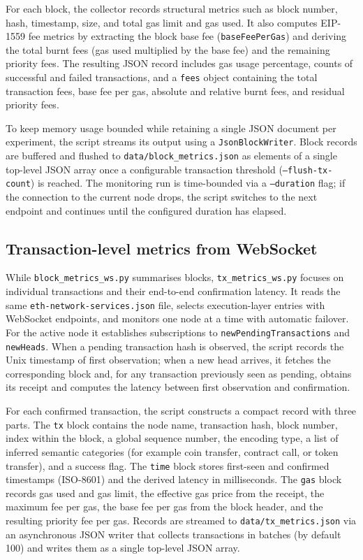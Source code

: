 For each block, the collector records structural metrics such as block number, hash, timestamp, size, and total gas limit and gas used. It also computes EIP-1559 fee metrics by extracting the block base fee (\texttt{baseFeePerGas}) and deriving the total burnt fees (gas used multiplied by the base fee) and the remaining priority fees. The resulting JSON record includes gas usage percentage, counts of successful and failed transactions, and a \texttt{fees} object containing the total transaction fees, base fee per gas, absolute and relative burnt fees, and residual priority fees.

To keep memory usage bounded while retaining a single JSON document per experiment, the script streams its output using a \texttt{JsonBlockWriter}. Block records are buffered and flushed to \texttt{data/block\_metrics.json} as elements of a single top-level JSON array once a configurable transaction threshold (\texttt{--flush-tx-count}) is reached. The monitoring run is time-bounded via a \texttt{--duration} flag; if the connection to the current node drops, the script switches to the next endpoint and continues until the configured duration has elapsed.

\subsection{Transaction-level metrics from WebSocket}

While \texttt{block\_metrics\_ws.py} summarises blocks, \texttt{tx\_metrics\_ws.py} focuses on individual transactions and their end-to-end confirmation latency. It reads the same \texttt{eth-network-services.json} file, selects execution-layer entries with WebSocket endpoints, and monitors one node at a time with automatic failover. For the active node it establishes subscriptions to \texttt{newPendingTransactions} and \texttt{newHeads}. When a pending transaction hash is observed, the script records the Unix timestamp of first observation; when a new head arrives, it fetches the corresponding block and, for any transaction previously seen as pending, obtains its receipt and computes the latency between first observation and confirmation.

For each confirmed transaction, the script constructs a compact record with three parts. The \texttt{tx} block contains the node name, transaction hash, block number, index within the block, a global sequence number, the encoding type, a list of inferred semantic categories (for example coin transfer, contract call, or token transfer), and a success flag. The \texttt{time} block stores first-seen and confirmed timestamps (ISO-8601) and the derived latency in milliseconds. The \texttt{gas} block records gas used and gas limit, the effective gas price from the receipt, the maximum fee per gas, the base fee per gas from the block header, and the resulting priority fee per gas. Records are streamed to \texttt{data/tx\_metrics.json} via an asynchronous JSON writer that collects transactions in batches (by default 100) and writes them as a single top-level JSON array.

